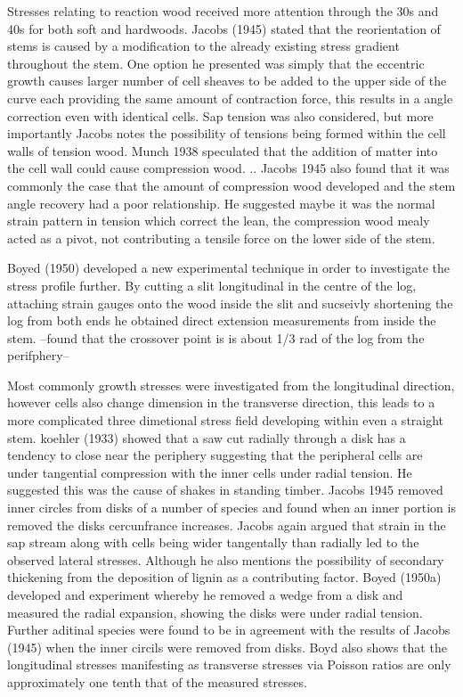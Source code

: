 \documentclass{article}
\begin{document}
Stresses relating to reaction wood received more attention through the 30s and
40s for both soft and hardwoods. Jacobs (1945) stated that the reorientation of
stems is caused by a modification to the already existing stress gradient
throughout the stem. One option he presented was simply that the eccentric
growth causes larger number of cell sheaves to be added to the upper side of the
curve each providing the same amount of contraction force, this results in a
angle correction even with identical cells. Sap tension was also considered, but
more importantly Jacobs notes the possibility of tensions being formed within the
cell walls of tension wood.
Munch 1938 speculated that the addition of matter into the cell wall could cause
compression wood. ..
Jacobs 1945 also found that it was commonly the case that the amount of
compression wood developed and the stem angle recovery had a poor relationship.
He suggested maybe it was the normal strain pattern in tension which
correct the lean, the compression wood mealy acted as a pivot, not contributing
a tensile force on the lower side of the stem.

Boyed (1950) developed a new experimental technique in order to investigate the
stress profile further. By cutting a slit longitudinal in the centre of the
log, attaching strain gauges onto the wood inside the slit and sucseivly
shortening the log from both ends he obtained direct extension measurements from
inside the stem. --found that the crossover point is is about 1/3 rad of the log
from the perifphery--

Most commonly growth stresses were investigated from the longitudinal direction,
however cells also change dimension in the transverse direction, this leads to a
more complicated three dimetional stress field developing within even a straight
stem.
koehler (1933) showed that a saw cut radially through a disk has a tendency to
close near the periphery suggesting that the peripheral cells are under
tangential compression with the inner cells under radial tension. He suggested this was the
cause of shakes in standing timber.
Jacobs 1945 removed inner circles from disks of a number of species and found
when an inner portion is removed the disks cercunfrance increases. Jacobs again
argued that strain in the sap stream along with cells being wider tangentally
than radially led to the observed lateral stresses. Although he also mentions
the possibility of secondary thickening from the deposition of lignin as a
contributing factor.
Boyed (1950a) developed and experiment whereby he removed a wedge from a disk
and measured the radial expansion, showing the disks were under radial
tension. Further aditinal species were found to be in agreement with the results
of Jacobs (1945) when the inner circils were removed from disks. Boyd also shows
that the longitudinal stresses manifesting as transverse stresses via Poisson
ratios are only approximately one tenth that of the measured stresses.
\end{document}
